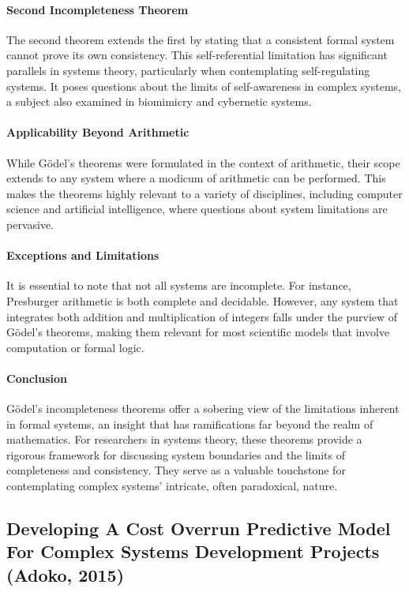 \documentclass[sn-nature]{sn-jnl}%
\theoremstyle{thmstyleone}%
\theoremstyle{thmstyletwo}%
\theoremstyle{thmstylethree}%
\begin{document}
\paragraph{Second Incompleteness Theorem}
The second theorem extends the first by stating that a consistent formal system cannot prove its own consistency. This self-referential limitation has significant parallels in systems theory, particularly when contemplating self-regulating systems. It poses questions about the limits of self-awareness in complex systems, a subject also examined in biomimicry and cybernetic systems.

\paragraph{Applicability Beyond Arithmetic}
While Gödel's theorems were formulated in the context of arithmetic, their scope extends to any system where a modicum of arithmetic can be performed. This makes the theorems highly relevant to a variety of disciplines, including computer science and artificial intelligence, where questions about system limitations are pervasive.

\paragraph{Exceptions and Limitations}
It is essential to note that not all systems are incomplete. For instance, Presburger arithmetic is both complete and decidable. However, any system that integrates both addition and multiplication of integers falls under the purview of Gödel's theorems, making them relevant for most scientific models that involve computation or formal logic.

\paragraph{Conclusion}
Gödel's incompleteness theorems offer a sobering view of the limitations inherent in formal systems, an insight that has ramifications far beyond the realm of mathematics. For researchers in systems theory, these theorems provide a rigorous framework for discussing system boundaries and the limits of completeness and consistency. They serve as a valuable touchstone for contemplating complex systems' intricate, often paradoxical, nature.

\subsection{Developing A Cost Overrun Predictive Model For Complex Systems Development Projects (Adoko, 2015)\cite{adoko_developing_2015}}
\end{document}
